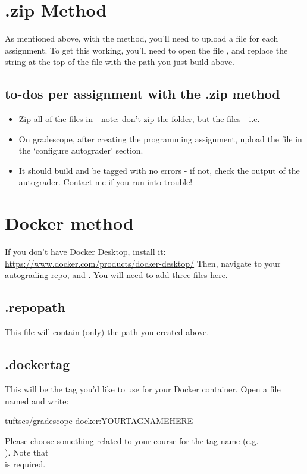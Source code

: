 \documentclass[11pt]{report}
\begin{document}
\section*{.zip Method}
As mentioned above, with the  method, you'll need to upload a  file for each 
assignment. To get this working, you'll need to open the file , and replace 
the  string at the top of the file with the path you just build above. 

\subsection*{to-dos per assignment with the .zip method} 
\begin{itemize}
      \item Zip all of the files in  - note: don't zip the folder, but the files - i.e. 
      \item On gradescope, after creating the programming assignment, upload the  file in 
            the `configure autograder' section.
      \item It should build and be tagged with no errors - if not, check the output of the autograder. 
            Contact me if you run into trouble!
\end{itemize}

\section*{Docker method}
If you don't have Docker Desktop, install it:\\ \textcolor{blue}{\href{https://www.docker.com/products/docker-desktop/}{https://www.docker.com/products/docker-desktop/}}
Then, navigate to your autograding repo, and .
You will need to add three files here.
\subsection*{.repopath}
This file will contain (only) the path you created above.

\subsection*{.dockertag}
This will be the tag you'd like to use for your Docker container. Open a file named 
and write:
\begin{bashcodeblock}
tuftscs/gradescope-docker:YOURTAGNAMEHERE      
\end{bashcodeblock}
Please choose something related to your course for the tag name (e.g. \\).
Note that \\ is required. 
\end{document}
